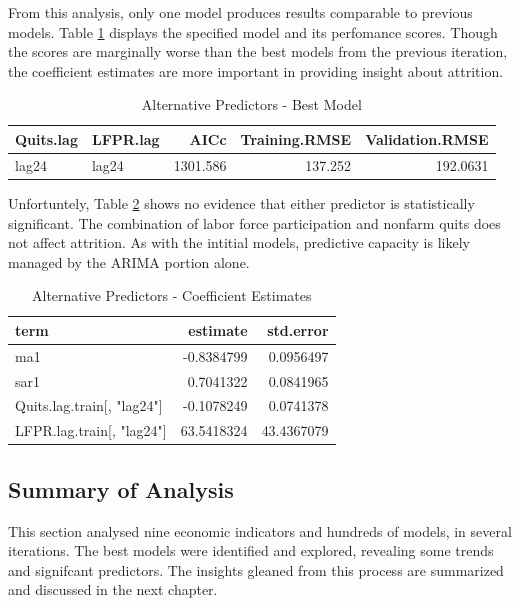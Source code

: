 \documentclass[12pt,letterpaper,toc=flat,oneside]{report}
\theoremstyle{definition}
\theoremstyle{definition}
\theoremstyle{definition}
\theoremstyle{remark}
\begin{document}
From this analysis, only one model produces results comparable to
previous models. Table \ref{tab:alt-indicators-1} displays the specified
model and its perfomance scores. Though the scores are marginally worse
than the best models from the previous iteration, the coefficient
estimates are more important in providing insight about attrition.

\begin{table}[!h]

\caption{\label{tab:alt-indicators-1}Alternative Predictors - Best Model}
\centering
\begin{tabular}[t]{llrrr}
\toprule
\bfseries{Quits.lag} & \bfseries{LFPR.lag} & \bfseries{AICc} & \bfseries{Training.RMSE} & \bfseries{Validation.RMSE}\\
\midrule
lag24 & lag24 & 1301.586 & 137.252 & 192.0631\\
\bottomrule
\end{tabular}
\end{table}

Unfortuntely, Table \ref{tab:alt-indicators-2} shows no evidence that
either predictor is statistically significant. The combination of labor
force participation and nonfarm quits does not affect attrition. As with
the intitial models, predictive capacity is likely managed by the ARIMA
portion alone.

\begin{table}[!h]

\caption{\label{tab:alt-indicators-2}Alternative Predictors - Coefficient Estimates}
\centering
\begin{tabular}[t]{lrr}
\toprule
\bfseries{term} & \bfseries{estimate} & \bfseries{std.error}\\
\midrule
ma1 & -0.8384799 & 0.0956497\\
sar1 & 0.7041322 & 0.0841965\\
Quits.lag.train[, "lag24"] & -0.1078249 & 0.0741378\\
LFPR.lag.train[, "lag24"] & 63.5418324 & 43.4367079\\
\bottomrule
\end{tabular}
\end{table}

\hypertarget{summary-of-analysis}{%
\subsection{Summary of Analysis}\label{summary-of-analysis}}

This section analysed nine economic indicators and hundreds of models,
in several iterations. The best models were identified and explored,
revealing some trends and signifcant predictors. The insights gleaned
from this process are summarized and discussed in the next chapter.
\end{document}
